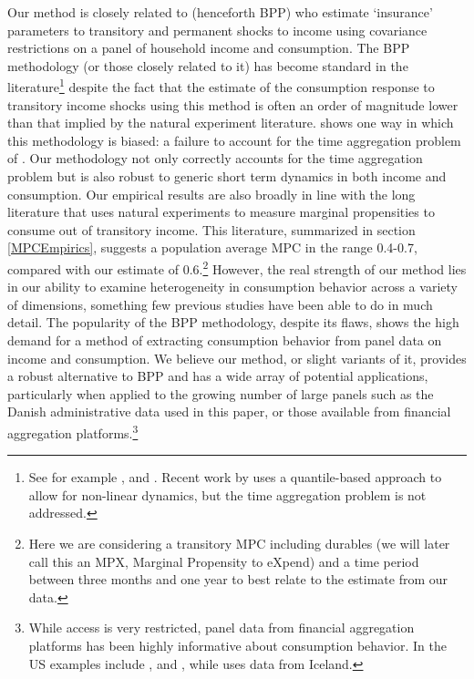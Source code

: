\documentclass[titlepage]{\econtex}\newcommand{\texname}{ConsumptionHeterogeneity}
\begin{document}
Our method is closely related to \cite{blundell_consumption_2008} (henceforth BPP) who estimate `insurance' parameters to transitory and permanent shocks to income using covariance restrictions on a panel of household income and consumption. The BPP methodology (or those closely related to it) has become standard in the literature\footnote{See for example \cite{violante_wealthy_2014}, \cite{auclert_monetary_2017} and \cite{manovskii_how_2017}. Recent work by \cite{arellano_earnings_2017} uses a quantile-based approach to allow for non-linear dynamics, but the time aggregation problem is not addressed.} despite the fact that the estimate of the consumption response to transitory income shocks using this method is often an order of magnitude lower than that implied by the natural experiment literature. \cite{crawley_time_2018} shows one way in which this methodology is biased: a failure to account for the time aggregation problem of \cite{working_note_1960}. Our methodology not only correctly accounts for the time aggregation problem but is also robust to generic short term dynamics in both income and consumption. Our empirical results are also broadly in line with the long literature that uses natural experiments to measure marginal propensities to consume out of transitory income. This literature, summarized in section \ref{MPCEmpirics}, suggests a population average MPC in the range 0.4-0.7, compared with our estimate of 0.6.\footnote{Here we are considering a transitory MPC including durables (we will later call this an MPX, Marginal Propensity to eXpend) and a time period between three months and one year to best relate to the estimate from our data.} However, the real strength of our method lies in our ability to examine heterogeneity in consumption behavior across a variety of dimensions, something few previous studies have been able to do in much detail. The popularity of the BPP methodology, despite its flaws, shows the high demand for a method of extracting consumption behavior from panel data on income and consumption. We believe our method, or slight variants of it, provides a robust alternative to BPP and has a wide array of potential applications, particularly when applied to the growing number of large panels such as the Danish administrative data used in this paper, or those available from financial aggregation platforms.\footnote{While access is very restricted, panel data from financial aggregation platforms has been highly informative about consumption behavior. In the US examples include \cite{gelman_harnessing_2014}, \cite{ganong_consumer_2017} and \cite{baker_debt_2015}, while \cite{vardardottir_liquid_2016} uses data from Iceland.}
\end{document}
